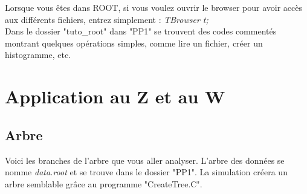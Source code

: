 \documentclass[a4paper]{report}
\begin{document}
Lorsque vous êtes dans ROOT, si vous voulez ouvrir le browser pour avoir accès aux différents fichiers, entrez simplement : \textit{TBrowser t;} \\

Dans le dossier "tuto\_root" dans "PP1" se trouvent des codes commentés montrant quelques opérations simples, comme lire un fichier, créer un histogramme, etc. \\




\section{Application au Z et au W}

\subsection{Arbre}
Voici les branches de l'arbre que vous aller analyser. L'arbre des donn\'{e}es se nomme \textit{data.root} et se trouve dans le dossier "PP1". La simulation cr\'{e}era un arbre semblable grâce au programme "CreateTree.C". \\
\end{document}
